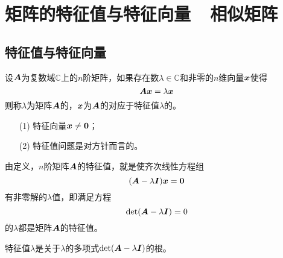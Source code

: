 \section{矩阵的特征值与特征向量~~相似矩阵}
\subsection{特征值与特征向量}

\begin{frame}[fragile]\ft{\subsecname}


  \begin{dingyi}[特征值与特征向量]
    设$\boldsymbol{A}$为复数域$\mathbb C$上的$n$阶矩阵，如果存在数$\lambda\in\mathbb C$和非零的$n$维向量${\boldsymbol{x}}$使得
    $$
    \boldsymbol{A}{\boldsymbol{x}}=\lambda{\boldsymbol{x}}
    $$
    则称$\lambda$为矩阵$\boldsymbol{A}$的，${\boldsymbol{x}}$为$\boldsymbol{A}$的对应于特征值$\lambda$的。
  \end{dingyi} 
\end{frame}

\begin{frame}[fragile]\ft{\subsecname}  
  \begin{itemize}
  \item[(1)] 特征向量${\boldsymbol{x}}\ne\boldsymbol{0}$；
  \item[(2)] 特征值问题是对方针而言的。 
  \end{itemize}
\end{frame}

\begin{frame}[fragile]\ft{\subsecname}  


  由定义，$n$阶矩阵$\boldsymbol{A}$的特征值，就是使齐次线性方程组
  $$
  (\boldsymbol{A}-\lambda\boldsymbol{I}){\boldsymbol{x}}=\boldsymbol{0}
  $$
  有非零解的$\lambda$值，即满足方程
  $$
  \mathrm{det}(\boldsymbol{A}-\lambda\boldsymbol{I})=0
  $$
  的$\lambda$都是矩阵$\boldsymbol{A}$的特征值。 \pause 


  \begin{jielun}
    特征值$\lambda$是关于$\lambda$的多项式$\mathrm{det}(\boldsymbol{A}-\lambda\boldsymbol{I})$的根。
  \end{jielun}

\end{frame}

